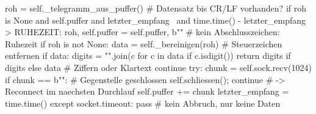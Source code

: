 \begin{python}[caption={Kern der Empfangsschleife in \texttt{Scanner\_TCP.py} (gekürzt)}, label={lst:qr_read}]
roh = self._telegramm_aus_puffer()          # Datensatz bis CR/LF vorhanden?
if roh is None and self.puffer and letzter_empfang \
        and time.time() - letzter_empfang > RUHEZEIT:
    roh, self.puffer = self.puffer, b""     # kein Abschlusszeichen: Ruhezeit
if roh is not None:
    data = self._bereinigen(roh)            # Steuerzeichen entfernen
    if data:
        digits = "".join(c for c in data if c.isdigit())
        return digits if digits else data   # Ziffern oder Klartext
    continue
try:
    chunk = self.sock.recv(1024)
    if chunk == b"":                        # Gegenstelle geschlossen
        self.schliessen(); continue         # -> Reconnect im naechsten Durchlauf
    self.puffer += chunk
    letzter_empfang = time.time()
except socket.timeout:
    pass                                    # kein Abbruch, nur keine Daten
\end{python}
